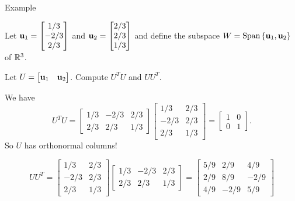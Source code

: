 \documentclass[xcolor=dvipsnames,aspectratio=169,t]{beamer}
\begin{document}
\begin{frame}{Example}
  \smallskip

  Let $\mathbf{u}_1 = \begin{bmatrix} 1/3 \\ -2/3 \\ 2/3 \end{bmatrix}$ and $\mathbf{u}_2 = \begin{bmatrix} 2/3 \\ 2/3 \\ 1/3 \end{bmatrix}$ and define the subspace $W = \mbox{Span} \left\{ \mathbf{u}_1 , \mathbf{u}_2 \right\}$  of $\mathbb{R}^3$.
  \smallskip
  
  Let $U = \begin{bmatrix} \mathbf{u}_1 & \mathbf{u}_2  \end{bmatrix}$.
  \alert{Compute} $U^TU$ and $UU^T$.
  \bigskip

  \pause
  We have 
  \[ U^TU=  \begin{bmatrix} 1/3 & -2/3 & 2/3 \\ 2/3 & 2/3 & 1/3 \end{bmatrix} 
  \begin{bmatrix} 1/3 & 2/3 \\ -2/3 & 2/3 \\ 2/3 & 1/3 \end{bmatrix} 
  = \begin{bmatrix} 1 & 0  \\ 0 & 1  \end{bmatrix}. \]
  So $U$ has \alert{orthonormal columns}!
  
  \pause
  \[ UU^T = \begin{bmatrix} 1/3 & 2/3 \\ -2/3 & 2/3 \\ 2/3 & 1/3 \end{bmatrix} \begin{bmatrix} 1/3 & -2/3 & 2/3 \\ 2/3 & 2/3 & 1/3 \end{bmatrix} = \begin{bmatrix} 5/9 & 2/9 & 4/9 \\ 2/9 & 8/9 & -2/9 \\ 4/9 & -2/9 & 5/9 \end{bmatrix} \]

\end{frame}
\end{document}
